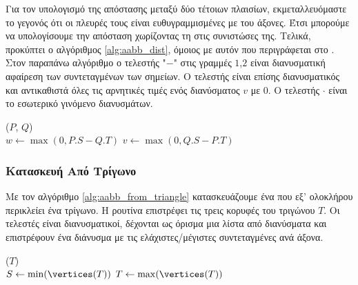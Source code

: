 Για τον υπολογισμό της απόστασης μεταξύ δύο τέτοιων πλαισίων, 
εκμεταλλευόμαστε το γεγονός ότι οι πλευρές τους είναι ευθυγραμμισμένες
με του άξονες.
Έτσι μπορούμε να υπολογίσουμε την απόσταση χωρίζοντας τη στις συνιστώσες της.
Τελικά, προκύπτει ο αλγόριθμος \ref{alg:aabb_dist}, 
όμοιος με αυτόν που περιγράφεται στο \cite{krishnamurthy2011gpu}.
Στον παραπάνω αλγόριθμο  ο τελεστής "$-$" στις γραμμές 
$1$,$2$ είναι διανυσματική αφαίρεση των συντεταγμένων των σημείων.
Ο τελεστής  είναι επίσης διανυσματικός και
αντικαθιστά όλες τις αρνητικές τιμές ενός διανύσματος $v$
με $0$.
Ο τελεστής $\cdot$ είναι το εσωτερικό γινόμενο διανυσμάτων.

\IncMargin{1.5em}
\begin{algorithm}[H]
    \label{alg:aabb_dist}
    \caption[Υπολογισμός Απόστασης δύο ]{
    }
    \DontPrintSemicolon
    \Indm\nonl\funcname($P$, $Q$)\\
    \Indp
        $w \gets \max(0, P.S - Q.T)$\;
        $v \gets \max(0, Q.S - P.T)$\;

    
\end{algorithm}
\DecMargin{1.5em}

\subsubsection{Κατασκευή  Από Τρίγωνο}
Με τον αλγόριθμο \ref{alg:aabb_from_triangle} κατασκευάζουμε 
ένα  που εξ' ολοκλήρου περικλείει ένα τρίγωνο.
Η ρουτίνα  επιστρέφει τις 
τρεις κορυφές του τριγώνου $T$.
Οι τελεστές  είναι διανυσματικοί,
δέχονται ως όρισμα μια λίστα από διανύσματα και επιστρέφουν 
ένα διάνυσμα με τις ελάχιστες/μέγιστες συντεταγμένες ανά άξονα.

\IncMargin{1.5em}
\begin{algorithm}[H]
    \label{alg:aabb_from_triangle}
    \caption[Κατασκευή  από Τρίγωνο]{
        }
    \DontPrintSemicolon
    \Indm\nonl\funcname($T$)\\
    \Indp
        $S \gets \min(\vertices(T))$\;
        $T \gets \max(\vertices(T))$\; 
    
\end{algorithm}
\DecMargin{1.5em}

